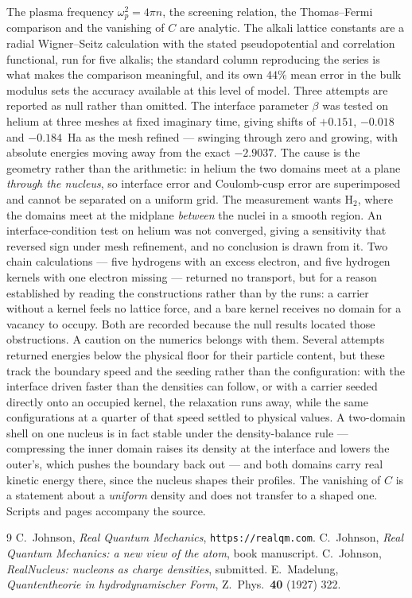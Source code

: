 \documentclass[11pt]{article}
\begin{document}
The plasma frequency $\omega_p^2=4\pi n$, the screening relation, the Thomas--Fermi comparison and
the vanishing of $C$ are analytic. The alkali lattice constants are a radial Wigner--Seitz
calculation with the stated pseudopotential and correlation functional, run for five alkalis; the
standard column reproducing the
series is what makes the comparison meaningful, and its own $44\%$ mean error in the bulk modulus
sets the accuracy available at this level of model. Three attempts are reported as null rather than omitted. The interface parameter
$\beta$ was tested on helium at three meshes at fixed imaginary time, giving shifts of $+0.151$,
$-0.018$ and $-0.184$~Ha as the mesh refined --- swinging through zero and growing, with absolute
energies moving away from the exact $-2.9037$. The cause is the geometry rather than the arithmetic:
in helium the two domains meet at a plane \emph{through the nucleus}, so interface error and
Coulomb-cusp error are superimposed and cannot be separated on a uniform grid. The measurement wants
$\mathrm{H_2}$, where the domains meet at the midplane \emph{between} the nuclei in a smooth
region. An interface-condition test on helium was
not converged, giving a sensitivity that reversed sign under mesh refinement, and no conclusion is
drawn from it. Two chain calculations --- five hydrogens with an excess electron, and five hydrogen
kernels with one electron missing --- returned no transport, but for a reason established by reading
the constructions rather than by the runs: a carrier without a kernel feels no lattice force, and a
bare kernel receives no domain for a vacancy to occupy. Both are recorded because the null results
located those obstructions. A caution on the numerics belongs with them. Several attempts returned
energies below the physical floor for their particle content, but these track the boundary speed and
the seeding rather than the configuration: with the interface driven faster than the densities can
follow, or with a carrier seeded directly onto an occupied kernel, the relaxation runs away, while the
same configurations at a quarter of that speed settled to physical values. A two-domain shell on one
nucleus is in fact stable under the density-balance rule --- compressing the inner domain raises its
density at the interface and lowers the outer's, which pushes the boundary back out --- and both
domains carry real kinetic energy there, since the nucleus shapes their profiles. The vanishing of
$C$ is a statement about a \emph{uniform} density and does not transfer to a shaped one. Scripts and pages accompany the source.



\begin{thebibliography}{9}
 C.~Johnson, \emph{Real Quantum Mechanics}, \texttt{https://realqm.com}.
 C.~Johnson, \emph{Real Quantum Mechanics: a new view of the atom}, book
manuscript.
 C.~Johnson, \emph{RealNucleus: nucleons as charge densities}, submitted.
 E.~Madelung, \emph{Quantentheorie in hydrodynamischer Form},
Z.~Phys.~\textbf{40} (1927) 322.
\end{thebibliography}
\end{document}
